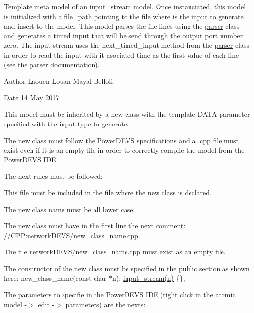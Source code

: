 Template meta model of an \hyperlink{classinput__stream}{input\+\_\+stream} model. Once instanciated, this model is initialized with a file\+\_\+path pointing to the file where is the input to generate and insert to the model. This model parses the file lines using the \hyperlink{classParser}{parser} class and generates a timed input that will be send through the output port number zero. The input stream uses the next\+\_\+timed\+\_\+input method from the \hyperlink{classParser}{parser} class in order to read the input with it asociated time as the first value of each line (see the \hyperlink{classParser}{parser} documentation). 

\begin{DoxyAuthor}{Author}
Laouen Louan Mayal Belloli 
\end{DoxyAuthor}
\begin{DoxyDate}{Date}
14 May 2017
\end{DoxyDate}
This model must be inherited by a new class with the template D\+A\+TA parameter specified with the input type to generate.

The new class must follow the Power\+D\+E\+VS specifications and a .cpp file must exist even if it is an empty file in order to correctly compile the model from the Power\+D\+E\+VS I\+DE.

The next rules must be followed\+:
\begin{DoxyEnumerate}
\item This file must be included in the file where the new class is declared.
\item The new class name must be all lower case.
\item The new class must have in the first line the next comment\+: //\+C\+PP\+:network\+D\+E\+V\+S/new\+\_\+class\+\_\+name.\+cpp.
\item The file network\+D\+E\+V\+S/new\+\_\+class\+\_\+name.\+cpp must exist as an empty file.
\item The constructor of the new class must be specified in the public section as shown here\+: new\+\_\+class\+\_\+name(const char $\ast$n)\+: \hyperlink{classinput__stream}{input\+\_\+stream(n)} \{\};
\end{DoxyEnumerate}

The parameters to specifie in the Power\+D\+E\+VS I\+DE (right click in the atomic model -\/$>$ edit -\/$>$ parameters) are the nexts\+:

